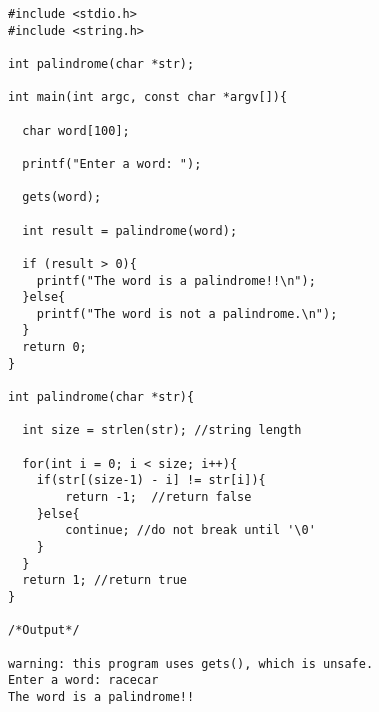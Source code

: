 \documentclass[10pt, a4paper, twocolumn]{article} %
\begin{document}
\begin{lstlisting}
#include <stdio.h>
#include <string.h>

int palindrome(char *str);

int main(int argc, const char *argv[]){

  char word[100];

  printf("Enter a word: ");

  gets(word);

  int result = palindrome(word);

  if (result > 0){
    printf("The word is a palindrome!!\n");
  }else{
    printf("The word is not a palindrome.\n");
  }
  return 0;
}

int palindrome(char *str){

  int size = strlen(str); //string length

  for(int i = 0; i < size; i++){
    if(str[(size-1) - i] != str[i]){
        return -1;  //return false
    }else{
        continue; //do not break until '\0'
    }
  }
  return 1; //return true
}

/*Output*/

warning: this program uses gets(), which is unsafe.
Enter a word: racecar
The word is a palindrome!!

\end{lstlisting}

\printbibliography[title={Bibliography}] %

\end{document}
